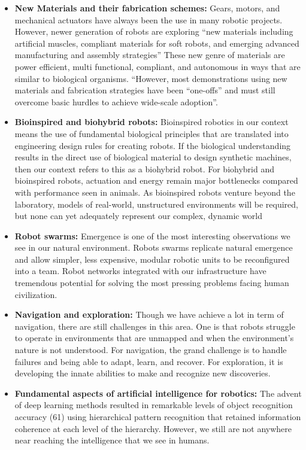\documentclass[conference]{IEEEtran}
\begin{document}
\begin{itemize}
\item \textbf{New Materials and their fabrication schemes:} Gears, motors, and mechanical actuators have always been the use in many robotic projects. However, newer generation of robots are exploring ``new materials including artificial muscles, compliant materials for soft robots, and emerging advanced manufacturing and assembly strategies''\autocite{yang2018grand} These new genre of materials are power efficient, multi functional, compliant, and autonomous in ways that are similar to biological organisms. ``However, most demonstrations using new materials and fabrication strategies have been “one-offs” and must still overcome basic hurdles to achieve wide-scale adoption''\autocite{yang2018grand}. 
\item \textbf{Bioinspired and biohybrid robots:} Bioinspired robotics in our context means the  use of fundamental biological principles that are translated into engineering design rules for creating robots. If the biological understanding results in the direct use of biological material to design synthetic machines, then our context refers to this as a biohybrid robot. For biohybrid and bioinspired robots, actuation and energy remain major bottlenecks compared with performance seen in animals. As bioinspired robots venture beyond the laboratory, models of real-world, unstructured environments will be required, but none can yet adequately represent our complex, dynamic world
\item \textbf{Robot swarms:} Emergence is one of the most interesting observations we see in our natural environment. Robots swarms replicate natural emergence and allow simpler, less expensive,
modular robotic units to be reconfigured into a team. Robot networks integrated with our infrastructure have tremendous potential for solving the most pressing problems facing human civilization. 
\item \textbf{Navigation and exploration:} Though we have achieve a lot in term of navigation, there are still challenges in this area. One is that robots struggle to operate in environments that are unmapped and when the environment's nature is not understood\autocite{yang2018grand}. For navigation, the grand challenge is to handle failures and being able to adapt, learn, and recover. For exploration, it is developing the innate abilities to make and recognize new discoveries.
\item \textbf{Fundamental aspects of artificial intelligence for robotics:} The advent of deep learning methods resulted in remarkable levels of object recognition accuracy (61) using hierarchical pattern recognition that retained information coherence at each level of the hierarchy. However, we still are not anywhere near reaching the intelligence that we see in humans.

\end{itemize}
\end{document}
